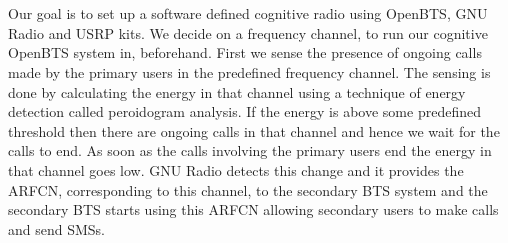 \chapter*{}
Our goal is to set up a software defined cognitive radio using OpenBTS, GNU Radio and USRP kits. 
We decide on a frequency channel, to run our cognitive OpenBTS system in, beforehand. 
First we sense the presence of ongoing calls made by the primary users in the predefined frequency channel. 
The sensing is done by calculating the energy in that channel using a technique of energy detection called peroidogram analysis.
If the energy is above some predefined threshold then there are ongoing calls in that channel and hence 
we wait for the calls to end. 
As soon as the calls involving the primary users end the energy in that channel goes low.
GNU Radio detects this change and it provides the ARFCN, corresponding to this channel, 
to the secondary BTS system and the secondary BTS starts using this ARFCN allowing 
secondary users to make calls and send SMSs.
